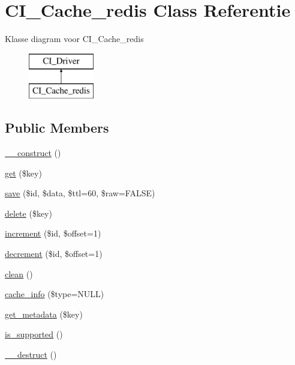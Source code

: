 \hypertarget{class_c_i___cache__redis}{}\section{C\+I\+\_\+\+Cache\+\_\+redis Class Referentie}
\label{class_c_i___cache__redis}
Klasse diagram voor C\+I\+\_\+\+Cache\+\_\+redis\begin{figure}[H]
\begin{center}
\leavevmode
\includegraphics[height=2.000000cm]{class_c_i___cache__redis}
\end{center}
\end{figure}
\subsection*{Public Members}
\begin{DoxyCompactItemize}
\item 
\mbox{\hyperlink{class_c_i___cache__redis_a095c5d389db211932136b53f25f39685}{\+\_\+\+\_\+construct}} ()
\item 
\mbox{\hyperlink{class_c_i___cache__redis_a24a9bf83a1002d46ece83a93d14bd921}{get}} (\$key)
\item 
\mbox{\hyperlink{class_c_i___cache__redis_a472645db04a8ce4b040b789a3062a7d2}{save}} (\$id, \$data, \$ttl=60, \$raw=F\+A\+L\+SE)
\item 
\mbox{\hyperlink{class_c_i___cache__redis_aa74a2edd6f3cbb5c5353f7faa97b6d70}{delete}} (\$key)
\item 
\mbox{\hyperlink{class_c_i___cache__redis_a2f07a4e09b57f4460d49852497d1808f}{increment}} (\$id, \$offset=1)
\item 
\mbox{\hyperlink{class_c_i___cache__redis_a4eb1c2772c8efc48c411ea060dd040b7}{decrement}} (\$id, \$offset=1)
\item 
\mbox{\hyperlink{class_c_i___cache__redis_adb40b812890a8bc058bf6b7a0e1a54d9}{clean}} ()
\item 
\mbox{\hyperlink{class_c_i___cache__redis_aa8b9c4d9f0387156736ccd8850f0727e}{cache\+\_\+info}} (\$type=N\+U\+LL)
\item 
\mbox{\hyperlink{class_c_i___cache__redis_ae0041475d947465622dfcef1fc53e43d}{get\+\_\+metadata}} (\$key)
\item 
\mbox{\hyperlink{class_c_i___cache__redis_a98c68fd153468bc148c4ed8c716859fc}{is\+\_\+supported}} ()
\item 
\mbox{\hyperlink{class_c_i___cache__redis_a421831a265621325e1fdd19aace0c758}{\+\_\+\+\_\+destruct}} ()
\end{DoxyCompactItemize}
